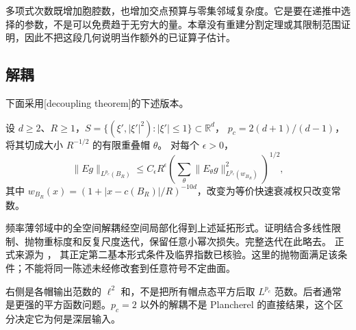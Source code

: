 \ProseParagraphBreak
多项式次数既增加胞腔数，也增加交点预算与零集邻域复杂度。它是要在递推中选择的参数，不是可以免费趋于无穷大的量。本章没有重建分割定理或其限制范围证明，因此不把这段几何说明当作额外的已证算子估计。

\subsection{解耦}
\label{b2:subsec:250504}

下面采用[decoupling theorem]的下述版本。

\begin{theorem}\label{b2:thm:25-decoupling}
设 \(d\geq2\)、\(R\geq1\)，\(S=\{(\xi',|\xi'|^2):|\xi'|\le1\}\subset\mathbb R^d\)，
\(p_c=2(d+1)/(d-1)\)，将其切成大小 \(R^{-1/2}\) 的有限重叠帽 \(\theta\)。
对每个 \(\epsilon>0\)，
\[
 \|Eg\|_{L^{p_c}(B_R)}
 \le C_\epsilon R^\epsilon
       \left(\sum_\theta\|E_\theta g\|_{L^{p_c}(w_{B_R})}^2\right)^{1/2},
\]
其中 \(w_{B_R}(x)=(1+|x-c(B_R)|/R)^{-10d}\)，改变为等价快速衰减权只改变常数。
\end{theorem}
\begin{proofsketch}
频率薄邻域中的全空间解耦经空间局部化得到上述延拓形式。证明结合多线性限制、抛物重标度和反复尺度迭代，保留任意小幂次损失。完整迭代在此略去。
正式来源为
\cite[Theorem 1.1; equation (7), pp.~352--355]{BourgainDemeter2015Proof}，
其正定第二基本形式条件及临界指数已核验。这里的抛物面满足该条件；不能将同一陈述未经修改套到任意符号不定曲面。
\end{proofsketch}
右侧是各帽输出范数的 \(\ell^2\) 和，不是把所有帽点态平方后取 \(L^{p_c}\) 范数。后者通常是更强的平方函数问题。\(p_c=2\) 以外的解耦不是 Plancherel 的直接结果，这个区分决定它为何是深层输入。
